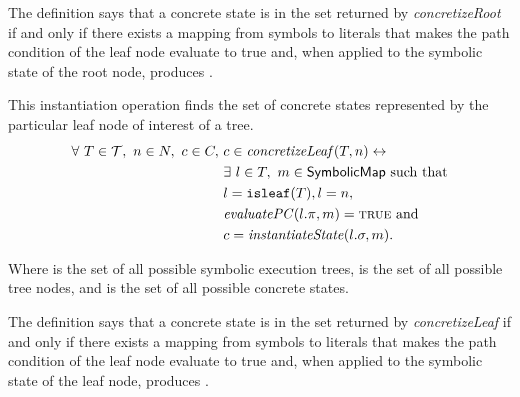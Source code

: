 The definition says that a concrete state \concstate{} is in the set returned by
\emph{concretizeRoot} if and only if there exists a mapping from symbols to
literals that makes the path condition of the leaf node evaluate to true
and, when applied to the symbolic state of the root node, produces
\concstate{}. 

\begin{mydefinition}
  \label{def:concleaf}

  This instantiation operation finds the set of concrete states represented by
  the particular leaf node of interest of a tree.
  \begin{align*}
\forall ~T \in \mathcal{T},~n \in N,~c \in C,~& c \in
\mathit{concretizeLeaf}(T,n) \leftrightarrow \\
&\exists~ l \in T,~ m \in \textsf{SymbolicMap} \mathrm{~such~that}\\
&l = \mathtt{isleaf}(T), l = n,\\
&\mathit{evaluatePC}(l.\pi, m) = \mathtt{\textsc{true}}~\mathrm{and}  \\
&c = \mathit{instantiateState}(l.\sigma, m).
    \end{align*}
\end{mydefinition}



Where \trees{} is the set of all possible symbolic execution trees, \nodes{} is
the set of all possible tree nodes, and
\concstates{} is the set of all possible concrete states.


The definition says that a concrete state \concstate{} is in the set returned by
\emph{concretizeLeaf} if and only if there exists a mapping from symbols to
literals that makes the path condition of the leaf node evaluate to true and,
when applied to the symbolic state of the leaf node, produces \concstate{}.

